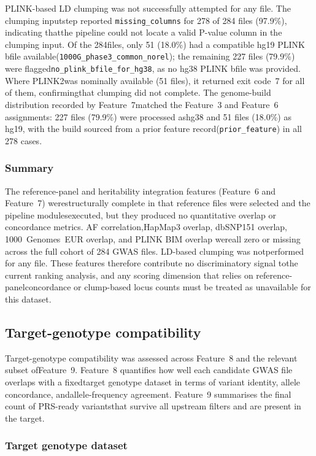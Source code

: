 \documentclass[11pt,a4paper]{article}
\begin{document}
PLINK-based LD clumping was not successfully attempted for any file. The clumping inputstep reported \texttt{missing\_columns} for 278 of 284 files (97.9\%), indicating thatthe pipeline could not locate a valid P-value column in the clumping input. Of the 284files, only 51 (18.0\%) had a compatible hg19 PLINK bfile available(\texttt{1000G\_phase3\_common\_norel}); the remaining 227 files (79.9\%) were flagged\texttt{no\_plink\_bfile\_for\_hg38}, as no hg38 PLINK bfile was provided. Where PLINK2was nominally available (51 files), it returned exit code~7 for all of them, confirmingthat clumping did not complete. The genome-build distribution recorded by Feature~7matched the Feature~3 and Feature~6 assignments: 227 files (79.9\%) were processed ashg38 and 51 files (18.0\%) as hg19, with the build sourced from a prior feature record(\texttt{prior\_feature}) in all 278 cases.

\subsubsection*{Summary}

The reference-panel and heritability integration features (Feature~6 and Feature~7) werestructurally complete in that reference files were selected and the pipeline modulesexecuted, but they produced no quantitative overlap or concordance metrics. AF correlation,HapMap3 overlap, dbSNP151 overlap, 1000~Genomes~EUR overlap, and PLINK BIM overlap wereall zero or missing across the full cohort of 284 GWAS files. LD-based clumping was notperformed for any file. These features therefore contribute no discriminatory signal tothe current ranking analysis, and any scoring dimension that relies on reference-panelconcordance or clump-based locus counts must be treated as unavailable for this dataset.

\subsection{Target-genotype compatibility}

Target-genotype compatibility was assessed across Feature~8 and the relevant subset ofFeature~9. Feature~8 quantifies how well each candidate GWAS file overlaps with a fixedtarget genotype dataset in terms of variant identity, allele concordance, andallele-frequency agreement. Feature~9 summarises the final count of PRS-ready variantsthat survive all upstream filters and are present in the target.

\subsubsection*{Target genotype dataset}
\end{document}
